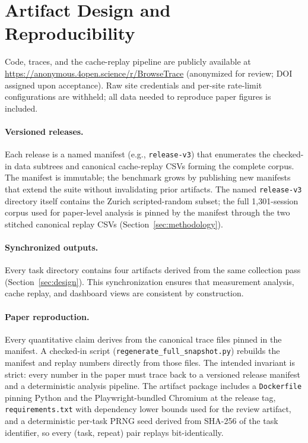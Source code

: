 \documentclass[10pt,sigconf,letterpaper,anonymous,nonacm]{acmart}
\newcommand{\release}{\texttt{release-v3}\xspace}
\begin{document}
\section{Artifact Design and Reproducibility}
\label{sec:artifact}

Code, traces, and the cache-replay pipeline are publicly available at
\url{https://anonymous.4open.science/r/BrowseTrace} (anonymized for review;
DOI assigned upon acceptance).  Raw site credentials and per-site
rate-limit configurations are withheld; all data needed to reproduce
paper figures is included.

\paragraph{Versioned releases.}
Each release is a named manifest (e.g., \release) that enumerates the
checked-in data subtrees and canonical cache-replay CSVs forming the
complete corpus.  The manifest is immutable; the benchmark grows by
publishing new manifests that extend the suite without invalidating
prior artifacts.  The named \release directory itself contains the
Zurich scripted-random subset; the full 1{,}301-session corpus used
for paper-level analysis is pinned by the manifest through the two
stitched canonical replay CSVs (Section~\ref{sec:methodology}).

\paragraph{Synchronized outputs.}
Every task directory contains four artifacts derived from the same
collection pass (Section~\ref{sec:design}).  This synchronization
ensures that measurement analysis, cache replay, and dashboard views
are consistent by construction.

\paragraph{Paper reproduction.}
Every quantitative claim derives from the canonical trace files
pinned in the manifest.  A checked-in script
(\texttt{regenerate\_full\_snapshot.py}) rebuilds the manifest and
replay numbers directly from those files.  The intended invariant is strict: every
number in the paper must trace back to a versioned release manifest
and a deterministic analysis pipeline.  The artifact package includes
a \texttt{Dockerfile} pinning Python and the Playwright-bundled Chromium at the release tag,
\texttt{requirements.txt} with dependency lower bounds used for the
review artifact, and a deterministic
per-task PRNG seed derived from SHA-256 of the task identifier, so every
(task, repeat) pair replays bit-identically.
\end{document}
